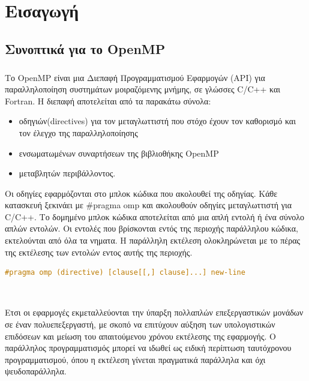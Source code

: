 \documentclass[12pt]{article}
\newcommand{\en}[1]{\foreignlanguage{english}{#1}}
\newcommand{\el}[1]{\selectlanguage{greek}{#1}\selectlanguage{english}}
\begin{document}
\clearpage
\singlespacing
\tableofcontents
{}

\renewcommand{\listfigurename}{Κατάλογος Εικόνων (αν υπάρχουν)}
\clearpage
\listoffigures

\renewcommand{\listtablename}{Κατάλογος Πινάκων (αν υπάρχουν)}
\clearpage
\listoftables

\clearpage
\begin{flushleft}
\lstlistoflistings
\end{flushleft}

\clearpage
\setcounter{page}{1}

\section{Εισαγωγή}
\subsection{Συνοπτικά για το \en{OpenMP}}
\subparagraph{}
Το \en{OpenMP} είναι μια Διεπαφή Προγραμματισμού Εφαρμογών \en{(API)} για παραλληλοποίηση συστημάτων μοιραζόμενης μνήμης, σε γλώσσες \en{C/C++} και \en{Fortran}. Η διεπαφή αποτελείται από τα παρακάτω σύνολα\cite{thenextstep20}:
\begin{itemize}
    \item οδηγιών\en{(directives)} για τον μεταγλωττιστή που στόχο έχουν τον καθορισμό και τον έλεγχο της παραλληλοποίησης
    \item ενσωματωμένων συναρτήσεων της βιβλιοθήκης \en{OpenMP}
    \item μεταβλητών περιβάλλοντος.
\end{itemize}



Οι οδηγίες εφαρμόζονται στο μπλοκ κώδικα που ακολουθεί της οδηγίας. Κάθε κατασκευή ξεκινάει με \en{\#pragma omp} και ακολουθούν οδηγίες μεταγλωττιστή για \en{C/C++}. Το δομημένο μπλοκ κώδικα αποτελείται από μια απλή εντολή ή ένα σύνολο απλών εντολών\cite{ompsyntaxrefguide}. Οι εντολές που βρίσκονται εντός της περιοχής παράλληλου κώδικα, εκτελούνται από όλα τα νηματα. Η παράλληλη εκτέλεση ολοκληρώνεται με το πέρας της εκτέλεσης των εντολών εντος αυτής της περιοχής.

\begin{lstlisting}[language=C++, caption={\el{Γραμματική σύνταξης οδηγίας} OpenMP}, frame = single, xleftmargin=.1\textwidth]
#pragma omp (directive) [clause[[,] clause]...] new-line
\end{lstlisting} 
\ \\
\par 
Ετσι οι εφαρμογές εκμεταλλεύονται την ύπαρξη πολλαπλών επεξεργαστικών μονάδων σε έναν πολυεπεξεργαστή, με σκοπό να επιτύχουν αύξηση των υπολογιστικών επιδόσεων και μείωση του απαιτούμενου χρόνου εκτέλεσης της εφαρμογής. Ο παράλληλος προγραμματισμός μπορεί να ιδωθεί ως ειδική περίπτωση ταυτόχρονου προγραμματισμού, όπου η εκτέλεση γίνεται πραγματικά παράλληλα και όχι ψευδοπαράλληλα\cite{googleparallelprog}.
\clearpage
\end{document}
